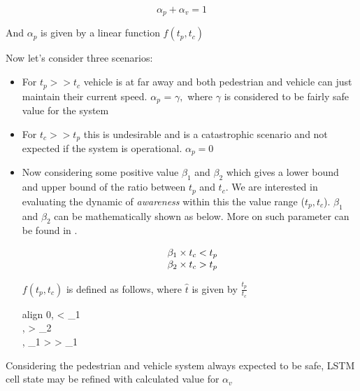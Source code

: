 \comment
{
}
\begin{equation} \label{awareness_factor}
  \alpha_p + \alpha_v = 1
\end{equation}

And $\alpha_p$ is given by a linear function \cite{osaragi2004modeling} $f(t_p, t_c)$ 

Now let's consider three scenarios:

\begin{itemize}
\item 
For ${t_p}>>{t_c}$ vehicle is at far away and both pedestrian and vehicle can just maintain their current speed. $\alpha_p$ = $\gamma,$ where $\gamma$ is considered to be fairly safe value for the system

\item 
For ${t_c}>>{t_p}$ this is undesirable and is a catastrophic scenario and not expected if the system is operational. $\alpha_p = 0$

\item
	Now considering some positive value $\beta_1$ and $\beta_2$ which gives a lower bound and upper bound of the ratio between $t_p$ and $t_c$. We are interested in evaluating the dynamic of \textit{awareness} within this the value range ($t_p, t_c$). $\beta_1$ and $\beta_2$ can be mathematically shown as below. More on such parameter can be found in \cite{yousef2016forward}.

	\begin{equation}
	\begin{array}{l@{}}
		\beta_1 \times {t_c} < {t_p} \\
		\beta_2 \times {t_c} > {t_p}
	\end{array}
	\end{equation}

	$f(t_p, t_c)$ is defined as follows, where $\hat{t}$ is given by $\frac{t_p}{t_c}$\\
	\begin{empheq}[left=\empheqlbrace]{align}
		0,  < \beta_1 \\
		\gamma,  > \beta_2 \\
		\gamma \times {}, \beta_1 >  > \beta_1
	\end{empheq}

\end {itemize}

Considering the pedestrian and vehicle system always expected to be safe, LSTM cell state may be refined with calculated value for $\alpha_v$

